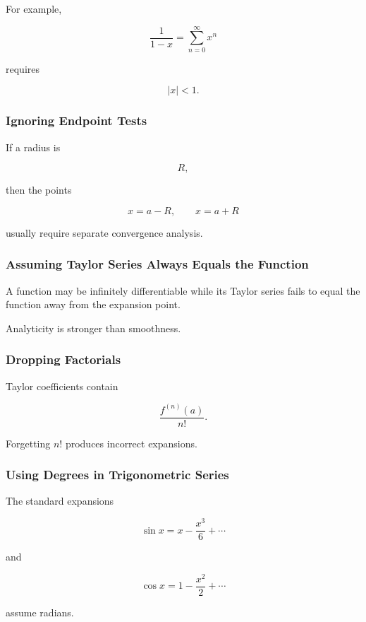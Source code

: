 For example,

\[
\frac{1}{1-x}
=
\sum_{n=0}^{\infty}x^n
\]

requires

\[
\boxed{
|x|<1.
}
\]

\subsubsection{Ignoring Endpoint Tests}

If a radius is

\[
R,
\]

then the points

\[
x=a-R,
\qquad
x=a+R
\]

usually require separate convergence analysis.

\subsubsection{Assuming Taylor Series Always Equals the Function}

A function may be infinitely differentiable while its Taylor series fails to
equal the function away from the expansion point.

Analyticity is stronger than smoothness.

\subsubsection{Dropping Factorials}

Taylor coefficients contain

\[
\boxed{
\frac{f^{(n)}(a)}{n!}.
}
\]

Forgetting \(n!\) produces incorrect expansions.

\subsubsection{Using Degrees in Trigonometric Series}

The standard expansions

\[
\sin x
=
x-\frac{x^3}{6}+\cdots
\]

and

\[
\cos x
=
1-\frac{x^2}{2}+\cdots
\]

assume radians.


